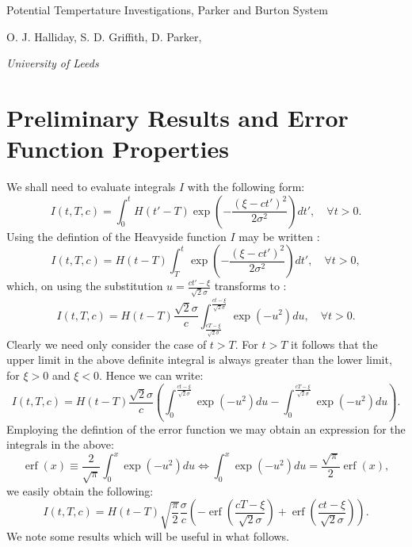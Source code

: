 \documentclass[12pt]{article}
\DeclareMathOperator\erf {erf}
\begin{document}
\begin{titlepage}

\vfill \LARGE
\begin{center}
Potential Tempertature Investigations, Parker and Burton System
\large

\rule{0mm}{20mm}

O. J.  Halliday, S. D. Griffith,  D. Parker,

 \vspace{3mm} {\em University of Leeds}





\end{center}

\pagestyle{empty}
\end{titlepage}
%
%
%
\section{Preliminary Results and Error Function Properties}
\label{sec_lemma}
%
We shall need to evaluate integrals $I$ with the following form:
%
\begin{equation}
I (t,T,c)= \int_0^t H(t'-T) \exp \left(- \frac{(\xi - c t')^2 }{ 2 \sigma^2} \right) dt', \quad \forall t>0.
\end{equation}
%
Using the defintion of the Heavyside function $I$ may be written :
%
\begin{equation}
I (t,T,c)= H(t-T) \int_T^t \exp \left(- \frac{(\xi - c t')^2 }{ 2 \sigma^2} \right) dt', \quad \forall t>0,
\end{equation}
%
which, on using the substitution $u = \frac{ct'-\xi}{\sqrt{2} \sigma}$ transforms to :
%
\begin{equation}
I (t,T,c) = H(t-T) \frac{\sqrt{2} \sigma }{ c } \int_{ \frac{cT-\xi}{\sqrt{2} \sigma}}^{ \frac{ct-\xi}{\sqrt{2} \sigma} } \exp \left(- u^2 \right) du, \quad \forall t>0.
\end{equation}
%
Clearly we need only consider the case of $t>T$. For $t>T$ it follows that the upper limit in the above definite integral is always greater than the lower limit,
for $\xi > 0$ and $\xi<0$. Hence we can write:
%
\begin{equation}
I (t,T,c) = H(t-T) \frac{\sqrt{2} \sigma }{ c }\left( \int_0^{ \frac{ct-\xi}{\sqrt{2} \sigma} } \exp \left(- u^2 \right) du  - \int_0^{ \frac{cT-\xi}{\sqrt{2} \sigma}} \exp \left(- u^2 \right) du\right) .
\end{equation}
%
Employing the defintion of the error function we may obtain an expression for the integrals in the above:
%
\begin{equation}
\erf (x) \equiv  \frac{ 2 }{\sqrt{ \pi } } \int_0^x \exp \left(- u^2 \right) du \iff  \int_0^x \exp \left(- u^2 \right) du = \frac{\sqrt{\pi}}{2} \erf(x),
\end{equation}
%
we easily obtain the following:
%
\begin{equation}
I (t,T,c) = H(t-T) \sqrt{ \frac{\pi}{2} } \frac{ \sigma }{ c }\left( - \erf \left( \frac{cT-\xi}{\sqrt{2} \sigma} \right) +  \erf \left( \frac{ct-\xi}{\sqrt{2} \sigma} \right)    \right) .
\end{equation}
%
We note some results which will be useful in what follows. 
\end{document}
